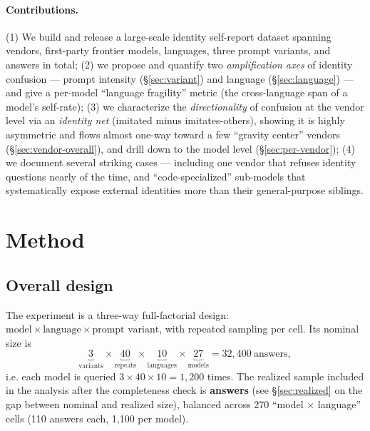 \documentclass[11pt]{article}
\begin{document}
\paragraph{Contributions.}
(1) We build and release a large-scale identity self-report dataset spanning
\statVendors{} vendors, \statModels{} first-party frontier models, \statLangs{}
languages, three prompt variants, and \statTotal{} answers in total;
(2) we propose and quantify two \emph{amplification axes} of identity confusion ---
prompt intensity (\S\ref{sec:variant}) and language (\S\ref{sec:language}) --- and give
a per-model ``language fragility'' metric (the cross-language span of a model's
self-rate);
(3) we characterize the \emph{directionality} of confusion at the vendor level via an
\emph{identity net} (imitated minus imitates-others), showing it is highly asymmetric
and flows almost one-way toward a few ``gravity center'' vendors
(\S\ref{sec:vendor-overall}), and drill down to the model level (\S\ref{sec:per-vendor});
(4) we document several striking cases --- including one vendor that refuses identity
questions nearly  of the time, and ``code-specialized'' sub-models that
systematically expose external identities more than their general-purpose siblings.

\section{Method}\label{sec:method}

\subsection{Overall design}\label{sec:design}
The experiment is a three-way full-factorial design:
$\text{model} \times \text{language} \times \text{prompt variant}$, with repeated
sampling per cell. Its nominal size is
\[
\underbrace{3}_{\text{variants}} \times \underbrace{40}_{\text{repeats}} \times
\underbrace{10}_{\text{languages}} \times \underbrace{27}_{\text{models}} = 32{,}400
\ \text{answers},
\]
i.e. each model is queried $3\times 40\times 10 = 1{,}200$ times. The realized sample
included in the analysis after the completeness check is \textbf{\statTotal{} answers}
(see \S\ref{sec:realized} on the gap between nominal and realized size), balanced across
270 ``model $\times$ language'' cells (110 answers each, 1{,}100 per model).
\end{document}
